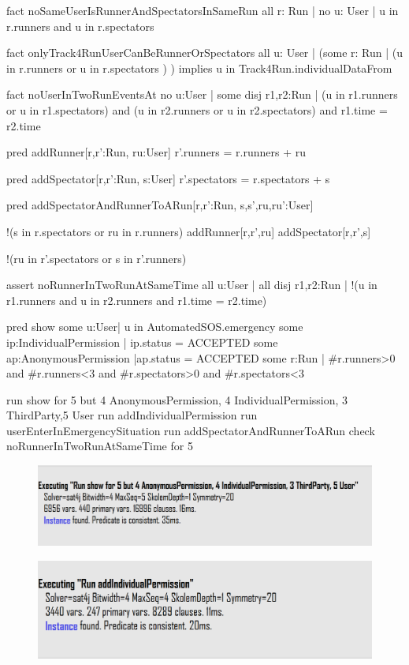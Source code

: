 \documentclass[a4paper]{article}
\begin{document}
{fact noSameUserIsRunnerAndSpectatorsInSameRun{
all r: Run | no u: User | u in r.runners and u in r.spectators
}

fact onlyTrack4RunUserCanBeRunnerOrSpectators{
all u: User | (some r: Run | (u in r.runners or u in r.spectators ) ) implies u in Track4Run.individualDataFrom
}

fact noUserInTwoRunEventsAt{
	no u:User | some disj r1,r2:Run | (u in r1.runners or u in r1.spectators) and (u in r2.runners or u in r2.spectators) and r1.time = r2.time
}

pred addRunner[r,r':Run, ru:User]{
	r'.runners = r.runners + ru
}

pred addSpectator[r,r':Run, s:User]{
	r'.spectators = r.spectators + s
}

pred addSpectatorAndRunnerToARun[r,r':Run, s,s',ru,ru':User]{
	!(s in r.spectators or ru in r.runners)
	addRunner[r,r',ru]
	addSpectator[r,r',s]

	!(ru in r'.spectators or s in r'.runners)
}

assert noRunnerInTwoRunAtSameTime{
	all u:User | all disj r1,r2:Run | !(u in r1.runners  and u in r2.runners and r1.time = r2.time)
}


pred show {
	some u:User| u in AutomatedSOS.emergency 
	some ip:IndividualPermission | ip.status = ACCEPTED 
	some ap:AnonymousPermission |ap.status = ACCEPTED
	some r:Run | #r.runners>0 and #r.runners<3 and #r.spectators>0 and #r.spectators<3
}

run show for 5 but 4 AnonymousPermission, 4 IndividualPermission, 3 ThirdParty,5 User
run addIndividualPermission
run  userEnterInEmergencySituation
run addSpectatorAndRunnerToARun
check noRunnerInTwoRunAtSameTime for 5}



\begin{figure}[H]
    \centering
    \includegraphics[width=\textwidth]{alloyResult1}
\end{figure}

\begin{figure}[H]
    \centering
    \includegraphics[width=\textwidth]{alloyResult2}
\end{figure}
\end{document}

